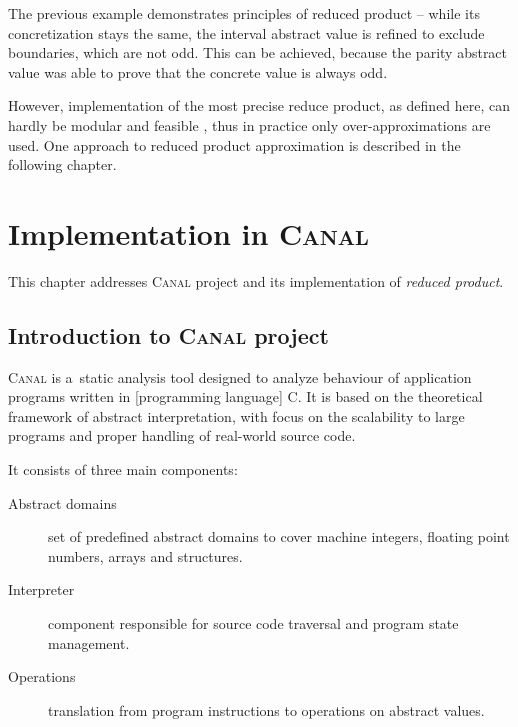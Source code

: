 \documentclass[12pt,oneside]{fithesis2}
\theoremstyle{definition}
\begin{document}
The previous example demonstrates principles of reduced product -- while its concretization stays the same, the interval abstract value is refined to exclude boundaries, which are not odd. This can be achieved, because the parity abstract value was able to prove that the concrete value is always odd.

However, implementation of the most precise reduce product, as defined here, can hardly be modular and feasible \cite{CousotCousotMauborgne-FoSSaCS-11}, thus in practice only over-approximations are used. One approach to reduced product approximation is described in the following chapter.

\chapter{Implementation in \textsc{Canal}}\label{ch:implementation}

This chapter addresses \textsc{Canal} project and its implementation of \textit{reduced product}.

\section{Introduction to \textsc{Canal} project}

\textsc{Canal} is a~static analysis tool designed to analyze behaviour of
application programs written in [programming language] C. It is based on the theoretical
framework of abstract interpretation, with focus on the scalability to
large programs and proper handling of real-world source code. \cite{Canal}

It consists of three main components:

\begin{description}
  \item[Abstract domains] set of predefined abstract domains to cover machine integers, floating point numbers, arrays and structures.
  \item[Interpreter] component responsible for source code traversal and program state management.
  \item[Operations] translation from program instructions to operations on abstract values.
\end{description}
\end{document}
